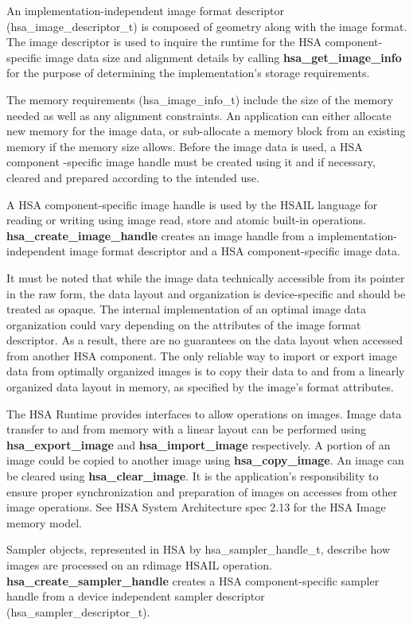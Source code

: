 \documentclass{book}
\newcommand{\reffun}[1]{\textbf{#1}}
\newcommand{\reftyp}[1]{#1}
\begin{document}
\begin{appendices}
An implementation-independent image format descriptor
(\reftyp{hsa\_image\_descriptor\_t}) is composed of geometry along with the image
format. The image descriptor is used to inquire the runtime for the
HSA component-specific image data size and alignment details by
calling \reffun{hsa\_get\_image\_info} for the purpose of determining the
implementation’s storage requirements.

The memory requirements (\reftyp{hsa\_image\_info\_t}) include the size of the
memory needed as well as any alignment constraints. An application can
either allocate new memory for the image data, or sub-allocate a
memory block from an existing memory if the memory size allows. Before
the image data is used, a HSA component -specific image handle must be
created using it and if necessary, cleared and prepared according to
the intended use.

A HSA component-specific image handle is used by the HSAIL language
for reading or writing using image read, store and atomic built-in
operations. \reffun{hsa\_create\_image\_handle} creates an image handle from a
implementation-independent image format descriptor and a HSA
component-specific image data.

It must be noted that while the image data technically accessible from
its pointer in the raw form, the data layout and organization is
device-specific and should be treated as opaque. The internal
implementation of an optimal image data organization could vary
depending on the attributes of the image format descriptor. As a
result, there are no guarantees on the data layout when accessed from
another HSA component. The only reliable way to import or export image
data from optimally organized images is to copy their data to and from
a linearly organized data layout in memory, as specified by the
image’s format attributes.

The HSA Runtime provides interfaces to allow operations on
images. Image data transfer to and from memory with a linear layout
can be performed using \reffun{hsa\_export\_image} and \reffun{hsa\_import\_image}
respectively. A portion of an image could be copied to another image
using \reffun{hsa\_copy\_image}. An image can be cleared using
\reffun{hsa\_clear\_image}. It is the application’s responsibility to ensure
proper synchronization and preparation of images on accesses from
other image operations. See HSA System Architecture spec 2.13 for the
HSA Image memory model.

Sampler objects, represented in HSA by \reftyp{hsa\_sampler\_handle\_t}, describe
how images are processed on an rdimage HSAIL
operation. \reffun{hsa\_create\_sampler\_handle} creates a HSA
component-specific sampler handle from a device independent sampler
descriptor (\reftyp{hsa\_sampler\_descriptor\_t}).


\end{appendices}
\end{document}
